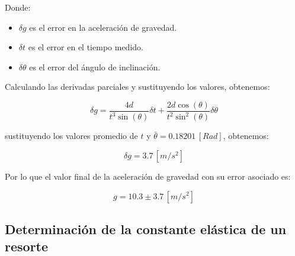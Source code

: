 \documentclass{article}
\begin{document}
\begin{multicols}{2}
    Donde:
    \begin{itemize}
        \item $\delta g$ es el error en la aceleración de gravedad.
        \item $\delta t$ es el error en el tiempo medido.
        \item $\delta \theta$ es el error del ángulo de inclinación.
    \end{itemize}

    Calculando las derivadas parciales y sustituyendo los valores, obtenemos:

    \begin{equation}
        \delta g = \dfrac{4d}{t^3 \sin(\theta)} \delta t + \dfrac{2d \cos(\theta)}{t^2 \sin^2(\theta)} \delta \theta
    \end{equation}

    sustituyendo los valores promedio de $t$ y $\bar{\theta} = 0.18201 \, [Rad]$, obtenemos:

    \begin{equation}
        \delta g = 3.7 \, [m/s^2]
    \end{equation}

    Por lo que el valor final de la aceleración de gravedad con su error asociado es:

    \begin{equation}
        g = 10.3 \pm 3.7 \, [m/s^2]
    \end{equation}

\subsection*{Determinación de la constante elástica de un resorte}


\end{multicols}
\end{document}
